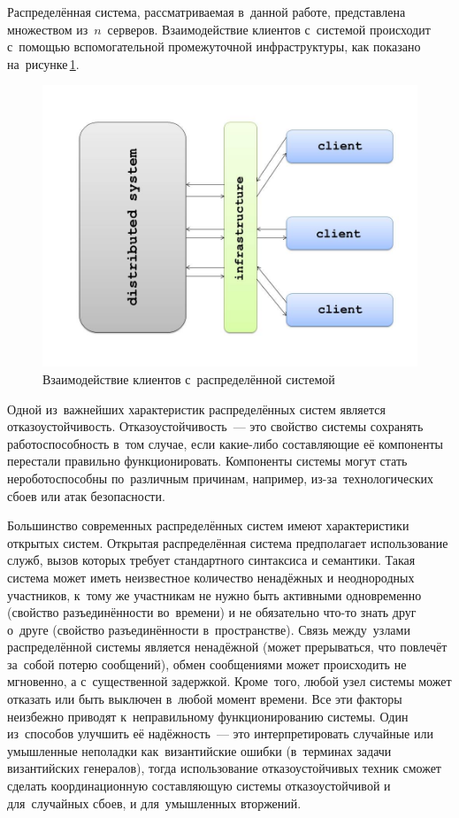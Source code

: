 Распределённая система, рассматриваемая в~данной работе, представлена множеством из~$n$~серверов. Взаимодействие клиентов с~системой происходит с~помощью вспомогательной промежуточной инфраструктуры, как показано на~рисунке\,\ref{clser}.
\begin{figure}[H]
	\centering \includegraphics[width=0.7 \textwidth, height=0.5 \textwidth]{img/ClientServer}  \caption{Взаимодействие клиентов с~распределённой системой} \label{clser}
\end{figure}

Одной из~важнейших характеристик распределённых систем является отказоустойчивость. Отказоустойчивость~--- это свойство системы сохранять работоспособность в~том случае, если какие-либо составляющие её компоненты перестали правильно функционировать. Компоненты системы могут стать нероботоспособны по~различным причинам, например, из-за~технологических сбоев или атак безопасности.

Большинство современных распределённых систем имеют характеристики открытых систем. Открытая распределённая система предполагает использование служб, вызов которых требует стандартного синтаксиса и семантики. Такая система может иметь неизвестное количество ненадёжных и неоднородных участников, к~тому же участникам не нужно быть активными одновременно (свойство разъединённости во~времени) и не обязательно что-то знать друг о~друге (свойство разъединённости в~пространстве). Связь между~узлами распределённой системы является ненадёжной (может прерываться, что повлечёт за~собой потерю сообщений), обмен сообщениями может происходить не мгновенно, а с~существенной задержкой. Кроме~того, любой узел системы может отказать или быть выключен в~любой момент времени. Все эти факторы неизбежно приводят к~неправильному функционированию системы. Один из~способов улучшить её надёжность~--- это интерпретировать случайные или умышленные неполадки как~византийские ошибки (в~терминах задачи византийских генералов), тогда использование отказоустойчивых техник сможет сделать координационную составляющую системы отказоустойчивой и для~случайных сбоев, и для~умышленных вторжений.

